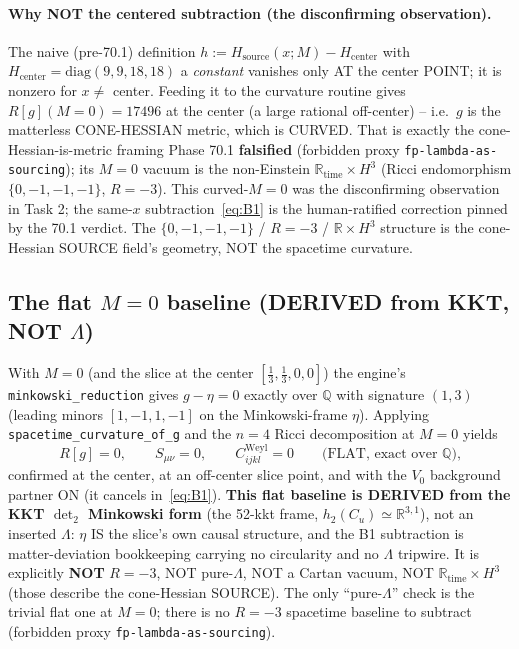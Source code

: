 \paragraph{Why NOT the centered subtraction (the disconfirming observation).} The
naive (pre-70.1) definition $h:=H_{\mathrm{source}}(x;M)-H_{\mathrm{center}}$ with
$H_{\mathrm{center}}=\mathrm{diag}(9,9,18,18)$ a \emph{constant} vanishes only AT the
center POINT; it is nonzero for $x\neq$ center. Feeding it to the curvature routine
gives $R[g](M{=}0)=17496$ at the center (a large rational off-center) -- i.e.\ $g$ is
the matterless CONE-HESSIAN metric, which is CURVED. That is exactly the
cone-Hessian-is-metric framing Phase 70.1 \textbf{falsified} (forbidden proxy
\texttt{fp-lambda-as-sourcing}); its $M=0$ vacuum is the non-Einstein
$\mathbb{R}_{\text{time}}\times H^3$ (Ricci endomorphism $\{0,-1,-1,-1\}$, $R=-3$).
This curved-$M=0$ was the disconfirming observation in Task 2; the same-$x$
subtraction~\eqref{eq:B1} is the human-ratified correction pinned by the 70.1 verdict.
The $\{0,-1,-1,-1\}$ / $R=-3$ / $\mathbb{R}\times H^3$ structure is the cone-Hessian
SOURCE field's geometry, NOT the spacetime curvature.

\subsection{The flat $M=0$ baseline (DERIVED from KKT, NOT $\Lambda$)}
\label{sec:flat-baseline}

With $M=0$ (and the slice at the center $[\tfrac13,\tfrac13,0,0]$) the engine's
\texttt{minkowski\_reduction} gives $g-\eta=0$ exactly over $\mathbb{Q}$ with signature
$(1,3)$ (leading minors $[1,-1,1,-1]$ on the Minkowski-frame $\eta$). Applying
\texttt{spacetime\_curvature\_of\_g} and the $n=4$ Ricci decomposition at $M=0$ yields
\begin{equation}
  R[g]=0,\qquad S_{\mu\nu}=0,\qquad C_{ijkl}^{\mathrm{Weyl}}=0
  \qquad\text{(FLAT, exact over $\mathbb{Q}$),}
\end{equation}
confirmed at the center, at an off-center slice point, and with the $V_0$ background
partner ON (it cancels in~\eqref{eq:B1}). \textbf{This flat baseline is DERIVED from
the KKT $\det_2$ Minkowski form} (the 52-kkt frame, $h_2(C_u)\simeq\mathbb{R}^{3,1}$),
not an inserted $\Lambda$: $\eta$ IS the slice's own causal structure, and the B1
subtraction is matter-deviation bookkeeping carrying no circularity and no $\Lambda$
tripwire. It is explicitly \textbf{NOT} $R=-3$, NOT pure-$\Lambda$, NOT a Cartan
vacuum, NOT $\mathbb{R}_{\text{time}}\times H^3$ (those describe the cone-Hessian
SOURCE). The only ``pure-$\Lambda$'' check is the trivial flat one at $M=0$; there is
no $R=-3$ spacetime baseline to subtract (forbidden proxy \texttt{fp-lambda-as-sourcing}).

